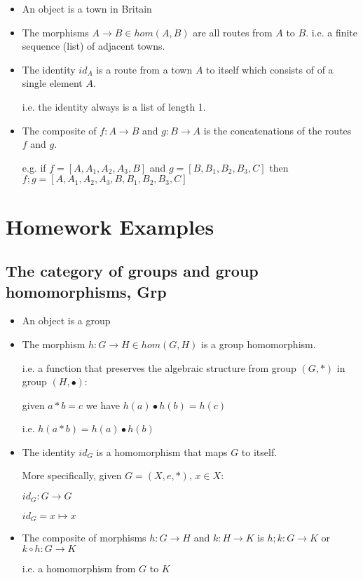 \documentclass[../main.tex]{subfiles}
\begin{document}
\begin{itemize}
  \item An object is a town in Britain
  \item The morphisms $A \rightarrow B \in hom(A,B)$ are all routes from $A$ to $B$. i.e. a finite sequence (list) of adjacent towns.
  \item The identity $id_A$ is a route from a town $A$ to itself which consists of of a single element $A$.

    i.e. the identity always is a list of length 1.

  \item The composite of $f : A \rightarrow B$ and $g : B \rightarrow A$ is the concatenations of the routes $f$ and $g$.

    e.g. if $f = [A,A_1,A_2,A_3,B]$ and $g = [B,B_1,B_2,B_3,C]$ then $f ; g = [A,A_1,A_2,A_3,B,B_1,B_2,B_3,C]$

\end{itemize}

\section{Homework Examples}

\subsection{The category of groups and group homomorphisms, Grp}

\begin{itemize}
  \item An object is a group
  \item The morphism $h : G \rightarrow H \in hom(G,H)$ is a group homomorphism. \par
        i.e. a function that preserves the algebraic structure from group $(G,*)$ in group $(H,\bullet)$: \par
        given $a * b = c$ we have $h(a) \bullet h(b) = h(c)$ \par
        i.e. $ h(a * b) = h(a) \bullet h(b)$
  \item The identity $id_G$ is a homomorphism that maps $G$ to itself.

    More specifically, given $G = (X,e,*)$, $x \in X$:

    $id_G : G \rightarrow G$

    $id_G = x \mapsto x$

  \item The composite of morphisms $h : G \rightarrow H$ and $k : H \rightarrow K$ is $h ; k : G \rightarrow K$ or $k \circ h : G \rightarrow K$ \par i.e. a homomorphism from $G$ to $K$
\end{itemize}
\end{document}

